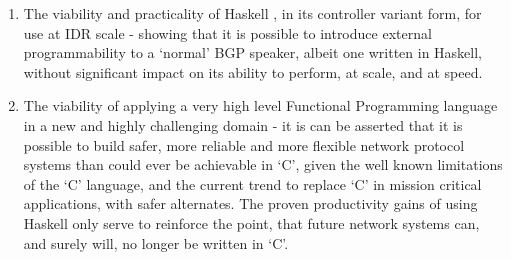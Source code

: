 \begin{enumerate}
    \item The viability and practicality of  Haskell  \hbgp, in its controller variant form, for use at IDR scale - showing that it is possible to introduce external programmability to a `normal' BGP speaker, albeit one written in Haskell, without significant impact on its ability to perform, at scale, and at speed.
    \item The viability of applying a very high level Functional Programming language in a new and highly challenging domain - it is can be asserted that it is possible to build safer, more reliable and more flexible network protocol systems than could ever be achievable in `C', given the well known limitations of the `C' language, and the current trend to replace `C' in mission critical applications, with safer alternates.  The proven productivity gains of using Haskell only serve to reinforce the point, that future network systems can, and surely will, no longer be written in `C'.
\end{enumerate}